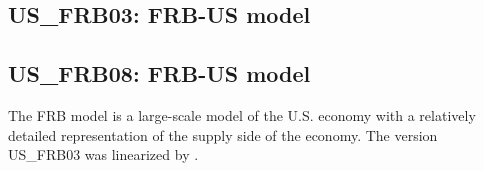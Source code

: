 \documentclass[11pt,a4paper]{article}
\begin{document}
	\subsection{US\_FRB03: FRB-US model} 
	\label{USFRB03}
	\subsection{US\_FRB08: FRB-US model}
	\label{USFRB08}
	\label{USFRB08mx}
	The FRB model is a large-scale model of the U.S. economy with a relatively detailed representation of the supply side of the economy. The version US\_FRB03 was linearized by \cite{LevinWielandWilliams2003}.
	
\end{document}
